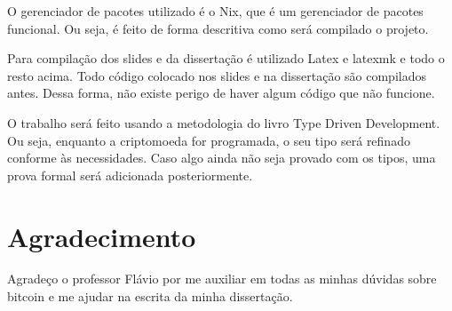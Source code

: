 \documentclass[12pt]{article}
\begin{document}
O gerenciador de pacotes utilizado é o Nix, que é um gerenciador de pacotes funcional. 
Ou seja, é feito de forma descritiva como será compilado o projeto.

Para compilação dos slides e da dissertação é utilizado Latex e latexmk e todo o resto acima.
Todo código colocado nos slides e na dissertação são compilados antes. Dessa forma, não existe perigo de haver algum código que não funcione.

O trabalho será feito usando a metodologia do livro Type Driven Development. Ou seja, enquanto a criptomoeda for programada, o seu tipo será refinado conforme às necessidades. Caso algo ainda não seja provado com os tipos, uma prova formal será adicionada posteriormente.

\section{Agradecimento}

Agradeço o professor Flávio por me auxiliar em todas as minhas dúvidas sobre bitcoin e me ajudar na escrita da minha dissertação. 

\newpage
 


\end{document}
